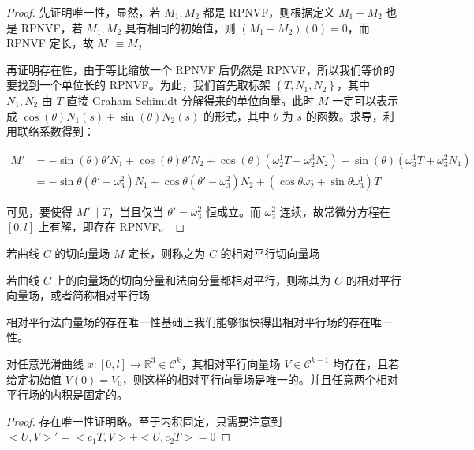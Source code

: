 \documentclass{notes}
\begin{document}
\begin{proof}
	先证明唯一性，显然，若 $M_1, M_2$ 都是 RPNVF，则根据定义 $M_1 - M_2$ 也是 RPNVF，若 $M_1, M_2$ 具有相同的初始值，则 $(M_1 - M_2)(0) = 0$，而 RPNVF 定长，故 $M_1 \equiv M_2$

	再证明存在性，由于等比缩放一个 RPNVF 后仍然是 RPNVF，所以我们等价的要找到一个单位长的 RPNVF。为此，我们首先取标架 $\left\lbrace T, N_1, N_2 \right\rbrace$，其中 $N_1, N_2$ 由 $T$ 直接 Graham-Schimidt 分解得来的单位向量。此时 $M$ 一定可以表示成 $\cos(\theta) N_1(s) + \sin (\theta) N_2(s)$ 的形式，其中 $\theta$ 为 $s$ 的函数。求导，利用联络系数得到：

	$$
		\begin{aligned}
		M' &= - \sin (\theta) \theta' N_1 + \cos (\theta) \theta' N_2 + \cos(\theta) (\omega_{2}^1 T + \omega_2^3 N_2) + \sin(\theta) (\omega_3^1 T + \omega_3^2 N_1) \\
		&= - \sin \theta(\theta' - \omega_3^2) N_1 + \cos \theta(\theta' - \omega_3^2) N_2 + (\cos \theta \omega_2^1 + \sin \theta \omega_3^1)T
		\end{aligned}
	$$

	可见，要使得 $M' \parallel T$，当且仅当 $\theta' = \omega_3^2$ 恒成立。而 $\omega_3^2$ 连续，故常微分方程在 $[0, l]$ 上有解，即存在 RPNVF。
\end{proof}

\begin{definition}
	若曲线 $C$ 的切向量场 $M$ 定长，则称之为 $C$ 的相对平行切向量场 
\end{definition}

\begin{definition}
	若曲线 $C$ 上的向量场的切向分量和法向分量都相对平行，则称其为 $C$ 的相对平行向量场，或者简称相对平行场
\end{definition}

相对平行法向量场的存在唯一性基础上我们能够很快得出相对平行场的存在唯一性。

\begin{theorem}
	对任意光滑曲线 $x: [0, l] \rightarrow \mathbb{R}^3 \in \mathcal{C}^k$，其相对平行向量场 $V \in \mathcal{C}^{k - 1}$ 均存在，且若给定初始值 $V(0) = V_0$，则这样的相对平行向量场是唯一的。并且任意两个相对平行场的内积是固定的。
\end{theorem}

\begin{proof}
	存在唯一性证明略。至于内积固定，只需要注意到 $<U, V>' = <c_1T, V> + <U, c_2T> = 0$
\end{proof}
\end{document}
